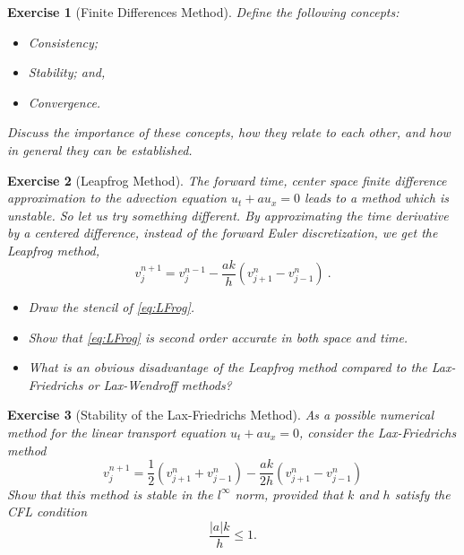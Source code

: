 \documentclass[10pt,letterpaper]{article}
\theoremstyle{break}
\newtheorem{exercise}{Exercise}
\begin{document}
\title{}
\date{}











\begin{exercise}[Finite Differences Method]
	Define the following concepts:
	\begin{itemize}
	\item[(a)] Consistency;
	\item[(b)] Stability; and,
	\item[(c)] Convergence.
	\end{itemize}
	Discuss the importance of these concepts, how they relate to each other, and how in general they can be established.
\end{exercise}

\begin{exercise}[Leapfrog Method]
	The forward time, center space finite difference
	approximation to the advection equation $u_t+au_x=0$
	leads to a method which is \emph{unstable}.
	So let us try something different.
	By approximating the time derivative by a centered difference,
	instead of the forward Euler discretization, we get the Leapfrog method,
	\begin{equation}\label{eq:LFrog}
		v_{j}^{n+1}=v_{j}^{n-1}-\frac{ak}{h}(v_{j+1}^{n}-v_{j-1}^{n})\ .
	\end{equation}
	\begin{itemize}
		\item[(i)]	Draw the stencil of \eqref{eq:LFrog}.

		\item[(ii)]	Show that \eqref{eq:LFrog} is second order accurate in both space and time.

		\item[(iii)] What is an obvious disadvantage of the Leapfrog method compared to the Lax-Friedrichs or Lax-Wendroff methods?
	\end{itemize}
\end{exercise}

\begin{exercise}[Stability of the Lax-Friedrichs Method]
	As a possible numerical method for the linear transport equation $u_t+au_x=0$, consider the Lax-Friedrichs method
	\begin{equation}
		v_{j}^{n+1}=\frac{1}{2}(v_{j+1}^{n}+v_{j-1}^{n})-\frac{ak}{2h}(v_{j+1}^{n}-v_{j-1}^{n})
	\end{equation}
	Show that this method is stable in the $l^\infty$ norm, provided that $k$ and $h$ satisfy the \textit{CFL condition}
	\begin{equation}
		\frac{|a|k}{h}\leq1.
	\end{equation}
\end{exercise}
\end{document}
